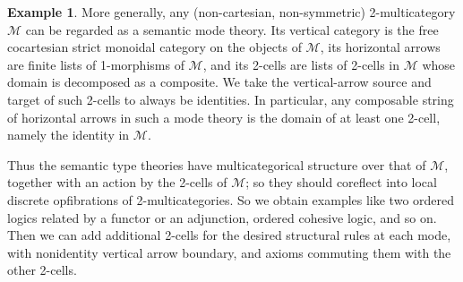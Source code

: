\documentclass{article}
\theoremstyle{definition}
\newtheorem{eg}[thm]{Example}
\theoremstyle{remark}
\def\M{\mathcal{M}}
\begin{document}
\begin{eg}
  More generally, any (non-cartesian, non-symmetric) 2-multicategory $\M$ can be regarded as a semantic mode theory.
  Its vertical category is the free cocartesian strict monoidal category on the objects of $\M$, its horizontal arrows are finite lists of 1-morphisms of $\M$, and its 2-cells are lists of 2-cells in $\M$ whose domain is decomposed as a composite.
  We take the vertical-arrow source and target of such 2-cells to always be identities.
  In particular, any composable string of horizontal arrows in such a mode theory is the domain of at least one 2-cell, namely the identity in $\M$.

  Thus the semantic type theories have multicategorical structure over that of $\M$, together with an action by the 2-cells of $\M$; so they should coreflect into local discrete opfibrations of 2-multicategories.
  So we obtain examples like two ordered logics related by a functor or an adjunction, ordered cohesive logic, and so on.
  Then we can add additional 2-cells for the desired structural rules at each mode, with nonidentity vertical arrow boundary, and axioms commuting them with the other 2-cells.
\end{eg}
\end{document}
